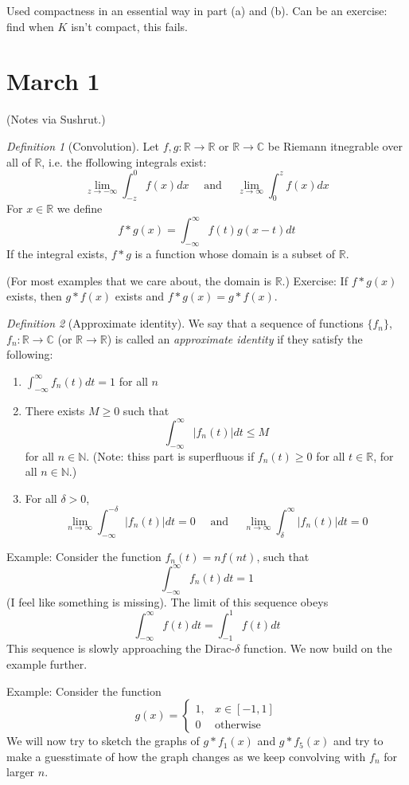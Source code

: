 \documentclass{article}
\theoremstyle{plain}
\theoremstyle{remark}
\newtheorem{definition}{Definition}
\newcommand{\N}{{\mathbb N}}
\newcommand{\R}{{\mathbb R}}
\newcommand{\C}{{\mathbb C}}
\begin{document}
Used compactness in an essential way in part (a) and (b).
Can be an exercise: find when $K$ isn't compact, this fails.


\section{March 1}
(Notes via Sushrut.)

\begin{definition}[Convolution]
	Let $f,g \colon \R \to \R$ or $\R \to \C$ be Riemann itnegrable over all of $\R$,
	i.e. the ffollowing integrals exist:
	\[
		\lim_{z\to-\infty} \int_{-z}^0 f(x)dx
		\quad\text{ and }\quad
		\lim_{z \to \infty} \int_0^z f(x)dx
	\]
	For $x \in \R$ we define
	\[
		f * g(x) = \int_{-\infty}^\infty f(t)g(x-t)dt
	\]
	If the integral exists, $f*g$ is a function whose domain is a subset of $\R$.
\end{definition}
(For most examples that we care about, the domain is $\R$.)
Exercise: If $f*g(x)$ exists, then $g*f(x)$ exists and $f*g(x) = g*f(x)$.

\begin{definition}[Approximate identity]
	We say that a sequence of functions $\{f_n\}$, $f_n \colon \R \to \C$
	(or $\R \to \R$) is called an \emph{approximate identity} if they satisfy the following:
	\begin{enumerate}
		\item $\int_{-\infty}^\infty f_n(t)dt = 1$ for all $n$
		\item There exists $M \geq 0$ such that
			\[
				\int_{-\infty}^\infty \lvert f_n(t) \rvert dt \leq M
			\]
			for all $n \in \N$.
			(Note: thiss part is superfluous if $f_n(t) \geq 0$
			for all $t \in \R$, for all $n \in \N$.)
		\item For all $\delta > 0$,
			\[
				\lim_{n \to \infty} \int_{-\infty}^{-\delta} \lvert f_n(t) \rvert dt = 0
				\quad \text{ and } \quad
				\lim_{n \to \infty} \int_{\delta}^{\infty} \lvert f_n(t) \rvert dt = 0
			\]
	\end{enumerate}
\end{definition}

Example: Consider the function $f_n(t) = nf(nt)$, such that
\[
	\int_{-\infty}^\infty f_n(t)dt = 1
\]
(I feel like something is missing).
The limit of this sequence obeys
\[
	\int_{-\infty}^\infty f(t)dt = \int_{-1}^1 f(t)dt
\]
This sequence is slowly approaching the Dirac-$\delta$ function.
We now build on the example further.

Example: Consider the function
\[
	g(x) = \begin{cases} 1, & x \in [-1,1]\\ 0 &\text{otherwise}\end{cases}
\]
We will now try to sketch the graphs of $g * f_1(x)$ and $g * f_5(x)$
and try to make a guesstimate of how the graph changes
as we keep convolving with $f_n$ for larger $n$.
\end{document}
